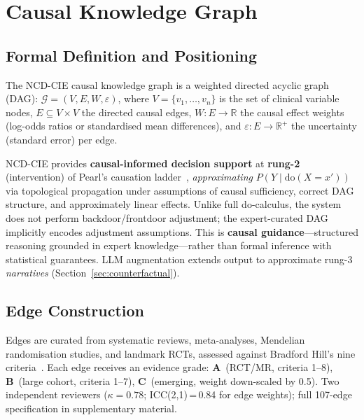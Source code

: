 \documentclass[runningheads]{llncs}
\begin{document}
\section{Causal Knowledge Graph}\label{sec:kg}

\subsection{Formal Definition and Positioning}\label{sec:formal}

The NCD-CIE causal knowledge graph is a weighted directed
acyclic graph (DAG):
$\mathcal{G} = (V, E, W, \varepsilon)$,
where $V=\{v_1,\ldots,v_n\}$ is the set of clinical variable nodes,
$E \subseteq V \times V$ the directed causal edges,
$W: E \rightarrow \mathbb{R}$ the causal effect weights
(log-odds ratios or standardised mean differences), and
$\varepsilon: E \rightarrow \mathbb{R}^+$ the uncertainty
(standard error) per edge.

NCD-CIE provides \textbf{causal-informed decision support}
at \textbf{rung-2} (intervention) of Pearl's causation
ladder~\cite{pearl2018book,hernan2020causal},
\emph{approximating} $P(Y \mid \mathrm{do}(X = x'))$ via
topological propagation under assumptions of causal sufficiency,
correct DAG structure, and approximately linear effects.
Unlike full do-calculus, the system does not perform backdoor/frontdoor
adjustment; the expert-curated DAG implicitly encodes adjustment
assumptions.
This is \textbf{causal guidance}---structured reasoning grounded in
expert knowledge---rather than formal inference with statistical
guarantees.
LLM augmentation extends output to approximate rung-3
\emph{narratives} (Section~\ref{sec:counterfactual}).

\subsection{Edge Construction}\label{sec:edges}

Edges are curated from systematic reviews, meta-analyses, Mendelian
randomisation studies, and landmark RCTs, assessed against
Bradford Hill's nine criteria~\cite{hill1965environment}.
Each edge receives an evidence grade:
\textbf{A}~(RCT/MR, criteria 1--8),
\textbf{B}~(large cohort, criteria 1--7),
\textbf{C}~(emerging, weight down-scaled by 0.5).
Two independent reviewers ($\kappa = 0.78$; ICC(2,1)\,=\,0.84
for edge weights); full 107-edge specification in supplementary
material.
\end{document}
